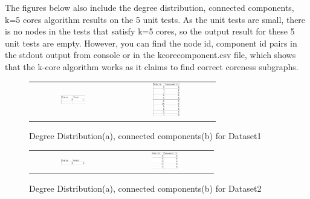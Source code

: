 The figures below also include the degree distribution, connected components, k=5 cores algorithm results on the 5 unit tests.
As the unit tests are small, there is no nodes in the tests that satisfy k=5 cores, so the output result for these 5 
unit tests are empty. 
However, you can find the node id, component id pairs in the stdout output from console or in the kcorecomponent.csv file, which shows that the k-core
algorithm works as it claims to find correct coreness subgraphs.

\begin{figure}[H]
\begin{center}
\begin{tabular}{cc}
     \includegraphics[width=0.3\textwidth]{FIG/1dd.jpg} &
     \includegraphics[width=0.3\textwidth]{FIG/1cc.jpg} \\
\end{tabular}
\caption{Degree Distribution(a), connected components(b) for Dataset1}
\end{center}
\end{figure}

\begin{figure}[H]
\begin{center}
\begin{tabular}{cc}
     \includegraphics[width=0.3\textwidth]{FIG/2dd.jpg} &
     \includegraphics[width=0.3\textwidth]{FIG/2cc.jpg} \\
\end{tabular}
\caption{Degree Distribution(a), connected components(b) for Dataset2}
\end{center}
\end{figure}


